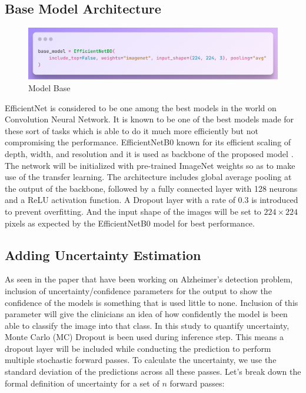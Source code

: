 \documentclass[12pt,onecolumn]{report}
\begin{document}
\subsection{Base Model Architecture}
\begin{figure}[h!]
    \centering
    \includegraphics[width=0.8\columnwidth]{figures/model_base.png}  %
    \caption{Model Base} %
    \label{fig:base model} %
\end{figure}
EfficientNet is considered to be one among the best models in the world on Convolution Neural Network. It is known to be one of the best models made for these sort of tasks which is able to do it much more efficiently but not compromising the performance. EfficientNetB0 known for its efficient scaling of depth, width, and resolution and it is used as backbone of the proposed model \cite{2021Hoang}. The network will be initialized with pre-trained ImageNet weights so as to make use of the transfer learning. The architecture includes global average pooling at the output of the backbone, followed by a fully connected layer with 128 neurons and a ReLU activation function. A Dropout layer with a rate of 0.3 is introduced to prevent overfitting. And the input shape of the images will be set to $224 \times 224$ pixels as expected by the EfficientNetB0 model for best performance.

\subsection{Adding Uncertainty Estimation}
As seen in the paper that have been working on Alzheimer’s detection problem, inclusion of uncertainty/confidence parameters for the output to show the confidence of the models is something that is used little to none. Inclusion of this parameter will give the clinicians an idea of how confidently the model is been able to classify the image into that class. In this study to quantify uncertainty, Monte Carlo (MC) Dropout is been used during inference step. This means a dropout layer will be included while conducting the prediction to perform multiple stochastic forward passes. To calculate the uncertainty, we use the standard deviation of the predictions across all these passes. Let’s break down the formal definition of uncertainty for a set of $n$ forward passes:
\end{document}
